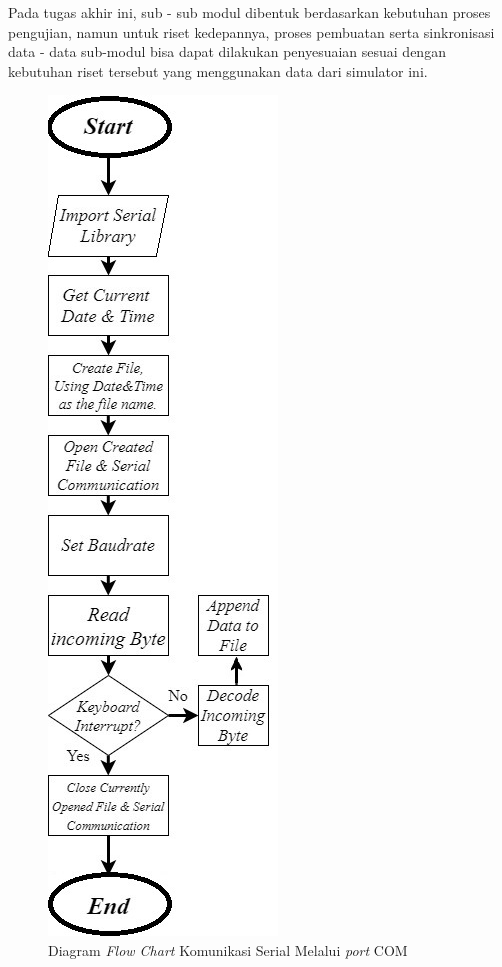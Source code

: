 Pada tugas akhir ini, sub - sub modul dibentuk berdasarkan kebutuhan proses pengujian, namun untuk riset kedepannya, proses pembuatan serta sinkronisasi data - data sub-modul bisa dapat dilakukan penyesuaian sesuai dengan kebutuhan riset tersebut yang menggunakan data dari simulator ini.
    
    
    

\begin{figure}  [!htb]
	        \captionsetup{justification=centering}
	        \includegraphics[scale=0.7]{img/serial-comm.jpg}
	        \caption{Diagram \textit{Flow Chart} Komunikasi Serial Melalui \textit{port} COM}
	        \label{fig: 3_25}
\end{figure}